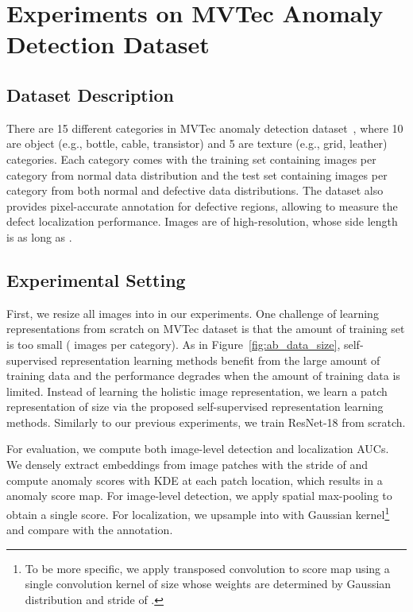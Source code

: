 \documentclass{article} \usepackage{iclr2021_conference,times}
\begin{document}
\clearpage
\clearpage

\section{Experiments on MVTec Anomaly Detection Dataset}
\label{sec:app_mvtec}

\subsection{Dataset Description}
\label{sec:app_mvtec_dataset}
There are 15 different categories in MVTec anomaly detection dataset~\cite{bergmann2019mvtec}, where 10 are object (e.g., bottle, cable, transistor) and 5 are texture (e.g., grid, leather) categories. Each category comes with the training set containing  images per category from normal data distribution and the test set containing  images per category from both normal and defective data distributions. The dataset also provides pixel-accurate annotation for defective regions, allowing to measure the defect localization performance. Images are of high-resolution, whose side length is as long as .

\subsection{Experimental Setting}
\label{sec:app_mvtec_exp_setting}

First, we resize all images into  in our experiments. One challenge of learning representations from scratch on MVTec dataset is that the amount of training set is too small ( images per category). As in Figure~\ref{fig:ab_data_size}, self-supervised representation learning methods benefit from the large amount of training data and the performance degrades when the amount of training data is limited. Instead of learning the holistic image representation, we learn a patch representation of size  via the proposed self-supervised representation learning methods. Similarly to our previous experiments, we train ResNet-18 from scratch. 

For evaluation, we compute both image-level detection and localization AUCs. We densely extract embeddings  from image patches with the stride of  and compute anomaly scores with KDE at each patch location, which results in a  anomaly score map. For image-level detection, we apply spatial max-pooling to obtain a single score. For localization, we upsample  into  with Gaussian kernel\footnote{To be more specific, we apply transposed convolution to  score map using a single convolution kernel of size  whose weights are determined by Gaussian distribution and stride of .}~\cite{liznerski2020explainable} and compare with the annotation. 
\end{document}
